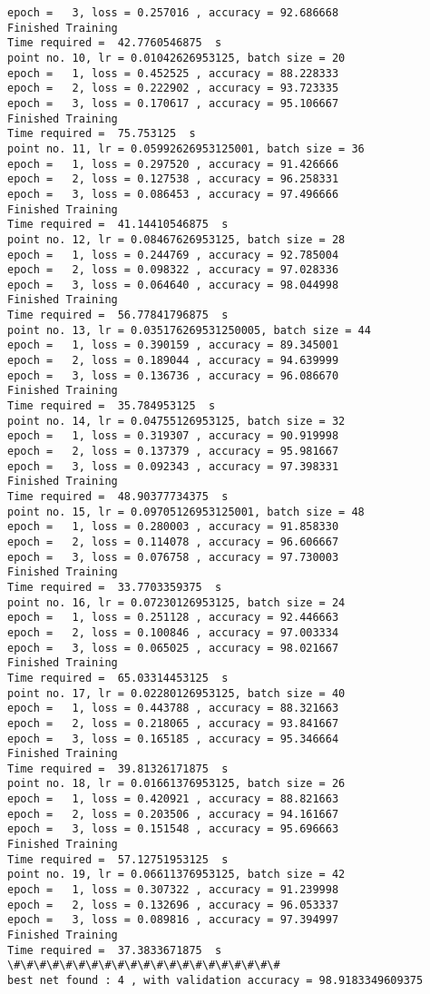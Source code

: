 \documentclass[11pt]{article}
\begin{document}
\begin{Verbatim}[commandchars=\\\{\}]
epoch =   3, loss = 0.257016 , accuracy = 92.686668
Finished Training
Time required =  42.7760546875  s 
point no. 10, lr = 0.01042626953125, batch size = 20
epoch =   1, loss = 0.452525 , accuracy = 88.228333
epoch =   2, loss = 0.222902 , accuracy = 93.723335
epoch =   3, loss = 0.170617 , accuracy = 95.106667
Finished Training
Time required =  75.753125  s 
point no. 11, lr = 0.05992626953125001, batch size = 36
epoch =   1, loss = 0.297520 , accuracy = 91.426666
epoch =   2, loss = 0.127538 , accuracy = 96.258331
epoch =   3, loss = 0.086453 , accuracy = 97.496666
Finished Training
Time required =  41.14410546875  s 
point no. 12, lr = 0.08467626953125, batch size = 28
epoch =   1, loss = 0.244769 , accuracy = 92.785004
epoch =   2, loss = 0.098322 , accuracy = 97.028336
epoch =   3, loss = 0.064640 , accuracy = 98.044998
Finished Training
Time required =  56.77841796875  s 
point no. 13, lr = 0.035176269531250005, batch size = 44
epoch =   1, loss = 0.390159 , accuracy = 89.345001
epoch =   2, loss = 0.189044 , accuracy = 94.639999
epoch =   3, loss = 0.136736 , accuracy = 96.086670
Finished Training
Time required =  35.784953125  s 
point no. 14, lr = 0.04755126953125, batch size = 32
epoch =   1, loss = 0.319307 , accuracy = 90.919998
epoch =   2, loss = 0.137379 , accuracy = 95.981667
epoch =   3, loss = 0.092343 , accuracy = 97.398331
Finished Training
Time required =  48.90377734375  s 
point no. 15, lr = 0.09705126953125001, batch size = 48
epoch =   1, loss = 0.280003 , accuracy = 91.858330
epoch =   2, loss = 0.114078 , accuracy = 96.606667
epoch =   3, loss = 0.076758 , accuracy = 97.730003
Finished Training
Time required =  33.7703359375  s 
point no. 16, lr = 0.07230126953125, batch size = 24
epoch =   1, loss = 0.251128 , accuracy = 92.446663
epoch =   2, loss = 0.100846 , accuracy = 97.003334
epoch =   3, loss = 0.065025 , accuracy = 98.021667
Finished Training
Time required =  65.03314453125  s 
point no. 17, lr = 0.02280126953125, batch size = 40
epoch =   1, loss = 0.443788 , accuracy = 88.321663
epoch =   2, loss = 0.218065 , accuracy = 93.841667
epoch =   3, loss = 0.165185 , accuracy = 95.346664
Finished Training
Time required =  39.81326171875  s 
point no. 18, lr = 0.01661376953125, batch size = 26
epoch =   1, loss = 0.420921 , accuracy = 88.821663
epoch =   2, loss = 0.203506 , accuracy = 94.161667
epoch =   3, loss = 0.151548 , accuracy = 95.696663
Finished Training
Time required =  57.12751953125  s 
point no. 19, lr = 0.06611376953125, batch size = 42
epoch =   1, loss = 0.307322 , accuracy = 91.239998
epoch =   2, loss = 0.132696 , accuracy = 96.053337
epoch =   3, loss = 0.089816 , accuracy = 97.394997
Finished Training
Time required =  37.3833671875  s 
\#\#\#\#\#\#\#\#\#\#\#\#\#\#\#\#\#\#\#\#\#
best net found : 4 , with validation accuracy = 98.9183349609375

    \end{Verbatim}
\end{document}
